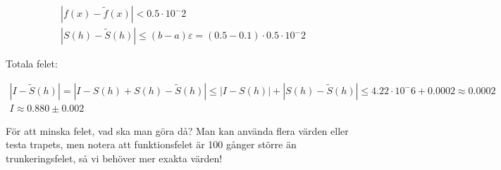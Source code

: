 \begin{equation*}
  \begin{gathered}
    |f(x)-\tilde{f}(x)|<0.5\cdot10^-2\\
    |S(h)-\tilde{S}(h)|\leq (b-a)\varepsilon = (0.5-0.1)\cdot0.5\cdot10^-2
  \end{gathered}
\end{equation*}
\par\bigskip
\noindent Totala felet:


\begin{equation*}
  \begin{gathered}
    |I-\tilde{S}(h)|=|I-S(h)+S(h)-\tilde{S}(h)|\leq |I-S(h)|+|S(h)-\tilde{S}(h)|\leq 4.22\cdot10^-6+0.0002\approx 0.0002\\
    I \approx 0.880\pm 0.002
  \end{gathered}
\end{equation*}
\par\bigskip
\noindent För att minska felet, vad ska man göra då? Man kan använda flera värden eller testa trapets, men notera att funktionsfelet är 100 gånger större än trunkeringsfelet, så vi behöver mer exakta värden!









